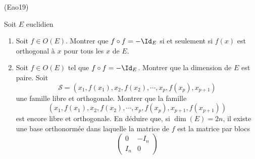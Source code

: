 \begin{tiny}(Eao19)\end{tiny} Soit $E$ euclidien
\begin{enumerate}
 \item Soit $f\in O(E)$. Montrer que $f\circ f = -\Id_E$ si et seulement si $f(x)$ est orthogonal à $x$ pour tous les $x$ de $E$.
 \item Soit $f\in O(E)$ tel que $f\circ f = -\Id_E$. Montrer que la dimension de $E$ est paire. Soit
\begin{displaymath}
 \mathcal{S}=\left( x_1,f(x_1),x_2,f(x_2),\cdots,x_p,f(x_p),x_{p+1}\right) 
\end{displaymath}
une famille libre et orthogonale. Montrer que la famille
\begin{displaymath}
 \left( x_1,f(x_1),x_2,f(x_2),\cdots,x_p,f(x_p),x_{p+1},f(x_{p+1})\right) 
\end{displaymath}
est encore libre et orthogonale. En déduire que, si $\dim(E)=2n$, il existe une base orthonormée dans laquelle la matrice de $f$ est la matrice par blocs
\begin{displaymath}
 \begin{pmatrix}
  0 & -I_n \\ I_n & 0
 \end{pmatrix}
\end{displaymath}
\end{enumerate}
 